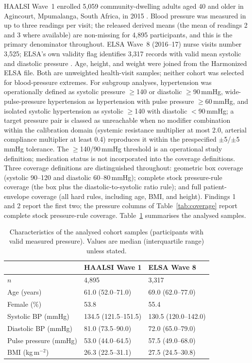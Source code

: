 \documentclass[preprint,12pt,nopreprintline]{elsarticle}
\begin{document}
HAALSI Wave~1 enrolled 5{,}059 community-dwelling adults aged 40 and older in Agincourt, Mpumalanga, South Africa, in 2015 \cite{haalsi}. Blood pressure was measured in up to three readings per visit; the released derived means (the mean of readings 2 and 3 where available) are non-missing for 4{,}895 participants, and this is the primary denominator throughout. ELSA Wave~8 (2016--17) nurse visits number 3{,}525; ELSA's own validity flag identifies 3{,}317 records with valid mean systolic and diastolic pressure \cite{elsa}. Age, height, and weight were joined from the Harmonized ELSA file. Both are unweighted health-visit samples; neither cohort was selected for blood-pressure extremes. For subgroup analyses, hypertension was operationally defined as systolic pressure $\geq$140 or diastolic $\geq$90\,mmHg, wide-pulse-pressure hypertension as hypertension with pulse pressure $\geq$60\,mmHg, and isolated systolic hypertension as systolic $\geq$140 with diastolic $<$90\,mmHg; a target pressure pair is classed as unreachable when no modifier combination within the calibration domain (systemic resistance multiplier at most 2.0, arterial compliance multiplier at least 0.4) reproduces it within the prespecified $\pm$5/$\pm$5\,mmHg tolerance. The $\geq$140/90\,mmHg threshold is an operational study definition; medication status is not incorporated into the coverage definitions. Three coverage definitions are distinguished throughout: geometric box coverage (systolic 90--120 and diastolic 60--80\,mmHg); complete stock pressure-rule coverage (the box plus the diastolic-to-systolic ratio rule); and full patient-envelope coverage (all hard rules, including age, BMI, and height). Findings 1 and 2 report the first two; the pressure columns of Table~\ref{tab:coverage} report complete stock pressure-rule coverage. Table~\ref{tab:cohort} summarises the analysed samples.

\begin{table}[t]
\centering
\caption{Characteristics of the analysed cohort samples (participants with valid measured pressure). Values are median (interquartile range) unless stated.}
\label{tab:cohort}
\begin{tabularx}{\textwidth}{lXX}
\toprule
 & HAALSI Wave 1 & ELSA Wave 8 \\
\midrule
$n$ & 4{,}895 & 3{,}317 \\
Age (years) & 61.0 (52.0--71.0) & 69.0 (62.0--77.0) \\
Female (\%) & 53.8 & 55.4 \\
Systolic BP (mmHg) & 134.5 (121.5--151.5) & 130.5 (120.0--142.0) \\
Diastolic BP (mmHg) & 81.0 (73.5--90.0) & 72.0 (65.0--79.0) \\
Pulse pressure (mmHg) & 53.0 (44.0--64.5) & 57.5 (49.0--68.0) \\
BMI (kg\,m$^{-2}$) & 26.3 (22.5--31.1) & 27.5 (24.5--30.8) \\
\bottomrule
\end{tabularx}
\end{table}
\end{document}
